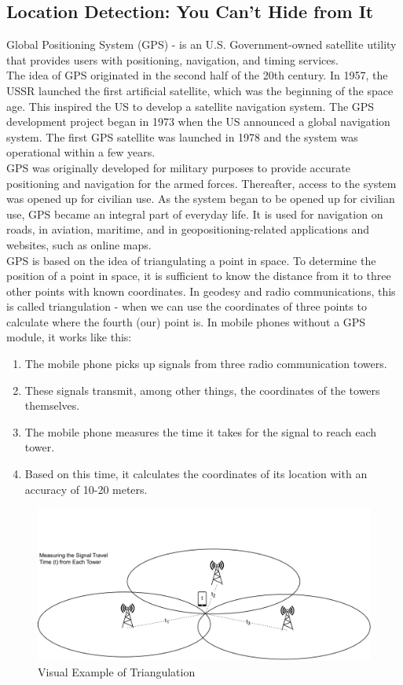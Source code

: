 \documentclass[10pt,oneside,english,a4paper]{article}
\begin{document}
\subsection{Location Detection: You Can't Hide from It} \label{internal:gps}
Global Positioning System (GPS) - is an U.S. Government-owned satellite utility that provides users with positioning, navigation, and timing services\cite{GPS.gov}.
\\The idea of GPS originated in the second half of the 20th century. In 1957, the USSR launched the first artificial satellite, which was the beginning of the space age. This inspired the US to develop a satellite navigation system. The GPS development project began in 1973 when the US announced a global navigation system. The first GPS satellite was launched in 1978 and the system was operational within a few years.
\\GPS was originally developed for military purposes to provide accurate positioning and navigation for the armed forces. Thereafter, access to the system was opened up for civilian use. As the system began to be opened up for civilian use, GPS became an integral part of everyday life. It is used for navigation on roads, in aviation, maritime, and in geopositioning-related applications and websites, such as online maps.
\\GPS is based on the idea of triangulating a point in space. To determine the position of a point in space, it is sufficient to know the distance from it to three other points with known coordinates. In geodesy and radio communications, this is called triangulation - when we can use the coordinates of three points to calculate where the fourth (our) point is. In mobile phones without a GPS module, it works like this:

\begin{enumerate}
\item The mobile phone picks up signals from three radio communication towers.
\item These signals transmit, among other things, the coordinates of the towers themselves.
\item The mobile phone measures the time it takes for the signal to reach each tower.
\item Based on this time, it calculates the coordinates of its location with an accuracy of 10-20 meters.
\end{enumerate}

\begin{figure}[h]
	\centering
	\includegraphics[scale=0.3]{diagram2.pdf}
	\caption{Visual Example of Triangulation}
	\label{fig:triangulation}
\end{figure}
\end{document}
